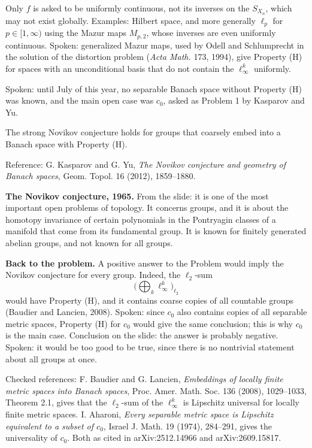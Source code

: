\noindent
Only $f$ is asked to be uniformly continuous,
not its inverses on the $S_{X_n}$, which may
not exist globally. Examples: Hilbert space,
and more generally $\ell_p$ for
$p \in [1,\infty)$ using the Mazur maps
$M_{p,2}$, whose inverses are even uniformly
continuous. Spoken: generalized Mazur maps,
used by Odell and Schlumprecht in the
solution of the distortion problem
(\emph{Acta Math.} 173, 1994), give
Property (H) for spaces with an unconditional
basis that do not contain the
$\ell_\infty^k$ uniformly.

Spoken: until July of this year, no separable
Banach space without Property (H) was known,
and the main open case was $c_0$, asked as
Problem 1 by Kasparov and Yu.

\begin{theorem}[Kasparov--Yu]
\label{theorem-kasparov-yu}
The strong Novikov conjecture holds for
groups that coarsely embed into a Banach
space with Property (H).
\end{theorem}

\noindent
Reference: G. Kasparov and G. Yu, \emph{The
Novikov conjecture and geometry of Banach
spaces}, Geom. Topol. 16 (2012), 1859--1880.

\medskip\noindent
{\bf The Novikov conjecture, 1965.} From the
slide: it is one of the most important open
problems of topology. It concerns groups, and
it is about the homotopy invariance of
certain polynomials in the Pontryagin classes
of a manifold that come from its fundamental
group. It is known for finitely generated
abelian groups, and not known for all groups.

\medskip\noindent
{\bf Back to the problem.} A positive answer
to the Problem would imply the Novikov
conjecture for every group. Indeed, the
$\ell_2$-sum
$$
\Big(\bigoplus_k \ell_\infty^k\Big)_{\ell_2}
$$
would have Property (H), and it contains
coarse copies of all countable groups
(Baudier and Lancien, 2008). Spoken: since
$c_0$ also contains copies of all separable
metric spaces, Property (H) for $c_0$ would
give the same conclusion; this is why $c_0$
is the main case. Conclusion on the slide:
the answer is probably negative. Spoken: it
would be too good to be true, since there is
no nontrivial statement about all groups at
once.

\begin{remark}
\label{remark-c0-universal-references}
Checked references: F. Baudier and
G. Lancien, \emph{Embeddings of locally
finite metric spaces into Banach spaces},
Proc. Amer. Math. Soc. 136 (2008),
1029--1033, Theorem 2.1, gives that the
$\ell_2$-sum of the $\ell_\infty^k$ is
Lipschitz universal for locally finite metric
spaces. I. Aharoni, \emph{Every separable
metric space is Lipschitz equivalent to a
subset of $c_0$}, Israel J. Math. 19
(1974), 284--291, gives the universality of
$c_0$. Both as cited in arXiv:2512.14966 and
arXiv:2609.15817.
\end{remark}

